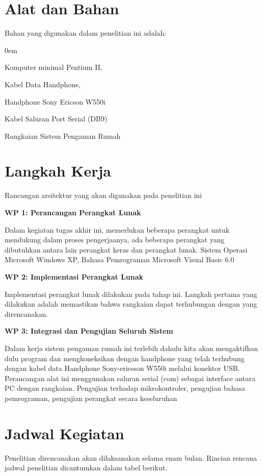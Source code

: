 \documentclass{jtetiproposalskripsi}
\begin{document}
\section{Alat dan Bahan}
Bahan yang digunakan dalam penelitian ini adalah:

\vspace{-0.5cm}

\begin{enumerate}[a.]
\begin{singlespace}
\itemsep0em
\item Komputer minimal Pentium II,
\item Kabel Data Handphone,
\item Handphone Sony Ericson W550i
\item Kabel  Saluran Port Serial (DB9) 
\item Rangkaian Sistem Pengaman Rumah
\end{singlespace}
\end{enumerate}

\section{Langkah Kerja}
Rancangan arsitektur yang akan digunakan pada penelitian ini 

\textbf{WP 1: Perancangan Perangkat Lunak}

Dalam kegiatan tugas akhir ini, memerlukan beberapa perangkat untuk mendukung dalam proses pengerjaanya, ada beberapa perangkat yang dibutuhkan antara lain perangkat keras dan perangkat lunak.
Sistem Operasi Microsoft Windows XP, Bahasa Pemrograman Microsoft Visual Basic 6.0


\textbf{WP 2: Implementasi Perangkat Lunak}

Implementasi perangkat lunak dilakukan pada tahap ini. Langkah pertama yang dilakukan adalah memastikan bahwa rangkaian dapat terhubungan dengan yang direncanakan.

\textbf{WP 3: Integrasi dan Pengujian Seluruh Sistem}

Dalam kerja sistem pengaman rumah ini terlebih dahulu kita akan mengaktifkan dulu program dan mengkoneksikan dengan handphone yang telah terhubung dengan kabel data Handphone Sony-ericsson W550i melalui konektor USB. Perancangan alat ini menggunakan saluran serial (com) sebagai interface antara PC dengan rangkaian. Pengujian terhadap mikrokontroler, pengujian bahasa pemrograman, pengujian perangkat secara keseluruhan

\section{Jadwal Kegiatan}
Penelitian direncanakan akan dilaksanakan selama enam bulan. Rincian rencana jadwal penelitian dicantumkan dalam tabel berikut.
\end{document}
